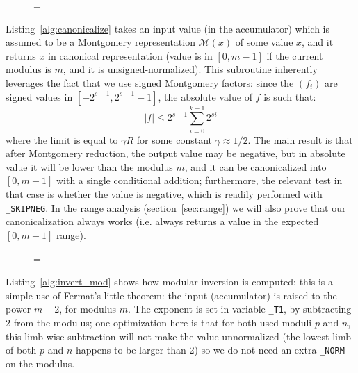\documentclass{llncs}
\newenvironment{forbidpagebreak}
    {\par\nobreak\vfil\penalty 0\vfilneg
     \vtop\bgroup}
    {\par\xdef\tpd{\the\prevdepth}\egroup
     \prevdepth=\tpd}
\newcommand{\mont}[1]{\mathcal{M}(#1)}
\begin{document}
\begin{figure}
\begin{forbidpagebreak}

\end{forbidpagebreak}
\end{figure}

Listing~\ref{alg:canonicalize} takes an input value (in the accumulator)
which is assumed to be a Montgomery representation $\mont{x}$ of some
value $x$, and it returns $x$ in canonical representation (value is in
$[0, m-1]$ if the current modulus is $m$, and it is
unsigned-normalized). This subroutine inherently leverages the fact that
we use signed Montgomery factors: since the $(f_i)$ are signed values in
$[-2^{s-1}, 2^{s-1} - 1]$, the absolute value of $f$ is such that:
\begin{equation*}
    |f| \leq 2^{s-1} \sum_{i=0}^{k-1} 2^{si}
\end{equation*}
where the limit is equal to $\gamma R$ for some constant $\gamma \approx
1/2$. The main result is that after Montgomery reduction, the output
value may be negative, but in absolute value it will be lower than the
modulus $m$, and it can be canonicalized into $[0, m-1]$ with a single
conditional addition; furthermore, the relevant test in that case is
whether the value is negative, which is readily performed with
\verb+_SKIPNEG+. In the range analysis (section~\ref{sec:range}) we will
also prove that our canonicalization always works (i.e. always returns a
value in the expected $[0, m-1]$ range).

\begin{figure}
\begin{forbidpagebreak}

\end{forbidpagebreak}
\end{figure}

Listing~\ref{alg:invert_mod} shows how modular inversion is computed: this
is a simple use of Fermat's little theorem: the input (accumulator) is
raised to the power $m-2$, for modulus $m$. The exponent is set in variable
\verb+_T1+, by subtracting 2 from the modulus; one optimization here is that
for both used moduli $p$ and $n$, this limb-wise subtraction will not make
the value unnormalized (the lowest limb of both $p$ and $n$ happens to be
larger than 2) so we do not need an extra \verb+_NORM+ on the modulus.
\end{document}
